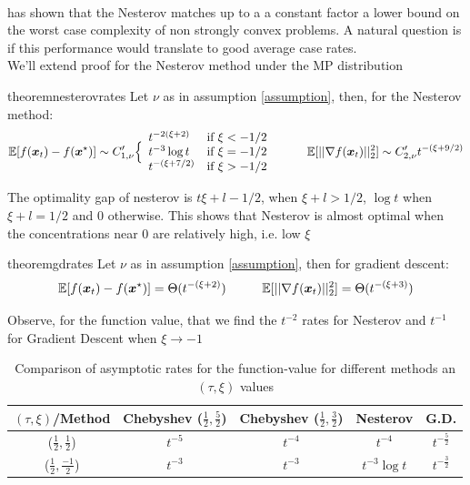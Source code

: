 \documentclass{article}
\begin{document}
\paragraph{}
\cite{nesterov2003introductory} has shown that the Nesterov matches up to a a constant factor a lower bound on the worst case complexity of non strongly convex problems. A natural question is if this performance would translate to good average case rates. \\
We'll extend \cite{paquette2020halting} proof for the Nesterov method under the MP distribution  
\begin{restatable}{theorem}{nesterovrates}
Let $\nu$ as in assumption \ref{assumption}, then, for the Nesterov method:
\begin{equation}
    \mathbb{E}[f({\boldsymbol x}_t)-f({\boldsymbol x}^\star)]\sim C'_{1,\nu}
    \Big\{\begin{array}{ll}
		  t^{-2(\xi+2)}& \mbox{if } 
		  \xi<-1/2\\
		  t^{-3}\log t& \mbox{if } 
		  \xi=-1/2\\
		  t^{-(\xi+7/2)}& \mbox{if } 
		  \xi>-1/2
	\end{array}\hspace{1 cm}
	\mathbb{E}[||\nabla f({\boldsymbol x}_t)||^2_2] \sim C'_{2,\nu}
		  t^{-(\xi+9/2)}
\end{equation}
\end{restatable}

The optimality gap of nesterov is $t{\xi+l-1/2}$, when $\xi+l>1/2$, $\log t$ when $\xi+l=1/2$ and $0$ otherwise.
This shows that Nesterov is almost optimal when the concentrations near $0$ are relatively high, i.e. low $\xi$\\

\begin{restatable}{theorem}{gdrates}
Let $\nu$ as in assumption \ref{assumption}, then for gradient descent:
\begin{equation}
\mathbb{E}[f({\boldsymbol x}_t)-f({\boldsymbol x}^\star)]=\Theta(t^{-(\xi+2)})\hspace{1 cm}
	\mathbb{E}[||\nabla f({\boldsymbol x}_t)||^2_2] =\Theta(t^{-(\xi+3)})
\end{equation}

\end{restatable}

Observe, for the function value, that we  find the $t^{-2}$ rates for Nesterov and $t^{-1}$ for Gradient Descent  when $\xi\rightarrow-1$

\begin{table}[H]
    \centering
    \begin{tabular}{c|c|c|c|c}
         $(\tau,\xi)$/Method& Chebyshev ($\frac{1}{2},\frac{5}{2}$) & Chebyshev ($\frac{1}{2},\frac{3}{2}$) &  Nesterov  & G.D. \\
         \hline
         ($\frac{1}{2},\frac{1}{2}$)&$t^{-5}$ & $t^{-4}$ & $t^{-4}$ & $t^{-\frac{5}{2}}$\\
         \hline
         ($\frac{1}{2},\frac{-1}{2}$)&$t^{-3}$ & $t^{-3}$ & $t^{-3}\log t$ & $t^{-\frac{3}{2}}$
    \end{tabular}
    \caption{Comparison of asymptotic rates for the function-value for different methods an $(\tau,\xi)$ values}
    \label{tab:theoretic rates}
\end{table}
\end{document}
